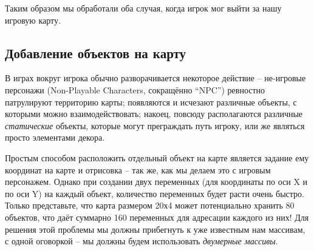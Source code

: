 \documentclass[../sparc.tex]{subfiles}
\begin{document}
Таким образом мы обработали оба случая, когда игрок мог выйти за нашу игровую
карту.

\subsection{Добавление объектов на карту}

В играх вокруг игрока обычно разворачивается некоторое действие -- не-игровые
персонажи (Non-Playable Characters, сокращённо ``NPC'') ревностно патрулируют
территорию карты; появляются и исчезают различные объекты, с которыми можно
взаимодействовать; накоец, повсюду располагаются различные \emph{статические}
объекты, которые могут преграждать путь игроку, или же являться просто
элементами декора.

Простым способом расположить отдельный объект на карте является задание ему
координат на карте и отрисовка -- так же, как мы делаем это с игровым
персонажем.  Однако при создании двух переменных (для координаты по оси X и по
оси Y) на каждый объект, количество переменных будет расти очень быстро.  Только
представьте, что карта размером 20х4 может потенциально хранить 80 объектов, что
даёт суммарно 160 переменных для адресации каждого из них!  Для решения этой
проблемы мы должны прибегнуть к уже известным нам массивам, с одной оговоркой --
мы должны будем использовать \emph{двумерные массивы}.
\end{document}
